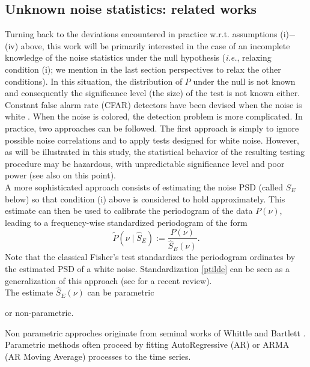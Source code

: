 \documentclass[journal]{IEEEtran}
\begin{document}
\subsection{Unknown  noise statistics: related works}
\label{rel}
Turning back to the deviations encountered in practice w.r.t. assumptions (i)$-$(iv) above, this work will be primarily interested  in the case of
an incomplete knowledge of the noise statistics under the null hypothesis (\textit{i.e.}, relaxing condition { (i)}; we mention in the last section perspectives to relax { the} other conditions). 
In this situation, the distribution of $P$ under the null is not known and  consequently the significance level (the size) of the test is not known either. 
{  Constant false alarm rate (CFAR) detectors have been devised when the noise is white \cite{Fisher_1929,Chiu_1989,Shimshoni_1971}.}
When the noise is colored, the detection problem is  more complicated. In practice, two approaches can be followed. The first approach is simply to ignore possible noise correlations and to apply { tests designed for white noise}. However, as will be illustrated in this study, the statistical behavior of the resulting testing procedure may be hazardous, with unpredictable significance level and poor power (see 
also \cite{Kay_1999} on this point). \\
 A more sophisticated approach consists { of} estimating  the noise PSD (called $S_E$ below) so that condition { (i)} above is considered to hold approximately.  
This estimate  can then be used to calibrate the periodogram of the data $P(\nu)$, leading to a frequency-wise standardized periodogram of the form  
\begin{equation}
\widetilde{P}(\nu\;|\; \widehat{S}_E):=\frac{P(\nu)}{\widehat{S}_E(\nu)}.
\label{ptilde}
\end{equation}
Note that the classical Fisher's test \cite{Fisher_1929} {  standardizes the periodogram ordinates
by the estimated  PSD of a white noise. Standardization \eqref{ptilde} can be seen as a generalization of this approach  (see \cite{Li_2014} for  a  recent review).} \\
  The estimate ${\widehat{S}_E(\nu)}$ can be  parametric 
  
{  or non-parametric}.
  
Non parametric approches  originate from  seminal works  {  of  Whittle  \cite{Whittle_1952} and  Bartlett \cite{Bartlett_1955}}.
Parametric methods  often proceed by fitting  AutoRegressive (AR) or ARMA (AR Moving Average)  processes to the time series. 
\end{document}
